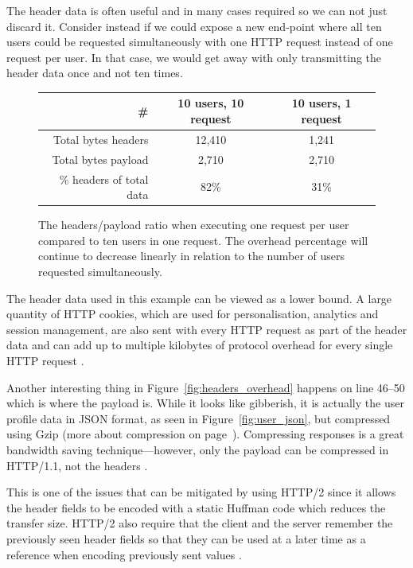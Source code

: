 \documentclass{cslthse-msc}
\begin{document}
The header data is often useful and in many cases required so we can not just discard it. Consider instead if we could expose a new end-point where all ten users could be requested simultaneously with one HTTP request instead of one request per user. In that case, we would get away with only transmitting the header data once and not ten times.

\begin{figure}[H]
  \centering
    \begin{center}
      \begin{tabular}{ r | c | c }
        \textbf{\#} & \textbf{10 users, 10 request} & \textbf{10 users, 1 request} \\ \hline
        Total bytes headers & 12,410 & 1,241 \\ \hline
        Total bytes payload & 2,710 & 2,710 \\ \hline
        \% headers of total data & 82\% & 31\% \\ \hline
      \end{tabular}
    \end{center}
  \caption{The headers/payload ratio when executing one request per user compared to ten users in one request. The overhead percentage will continue to decrease linearly in relation to the number of users requested simultaneously.}
\end{figure}

The header data used in this example can be viewed as a lower bound. A large quantity of HTTP cookies, which are used for personalisation, analytics and session management, are also sent with every HTTP request as part of the header data and can add up to multiple kilobytes of protocol overhead for every single HTTP request \cite[page 200]{HPBN}.

Another interesting thing in Figure~\ref{fig:headers_overhead} happens on line 46--50 which is where the payload is. While it looks like gibberish, it is actually the user profile data in JSON format, as seen in Figure~\ref{fig:user_json}, but compressed using Gzip (more about compression on page~\pageref{compression_more}). Compressing responses is a great bandwidth saving technique---however, only the payload can be compressed in HTTP/1.1, not the headers \cite{rfc2616}.

This is one of the issues that can be mitigated by using HTTP/2 since it allows the header fields to be encoded with a static Huffman code which reduces the transfer size. HTTP/2 also require that the client and the server remember the previously seen header fields so that they can be used at a later time as a reference when encoding previously sent values \cite[page 19]{hpbn2}.
\end{document}
